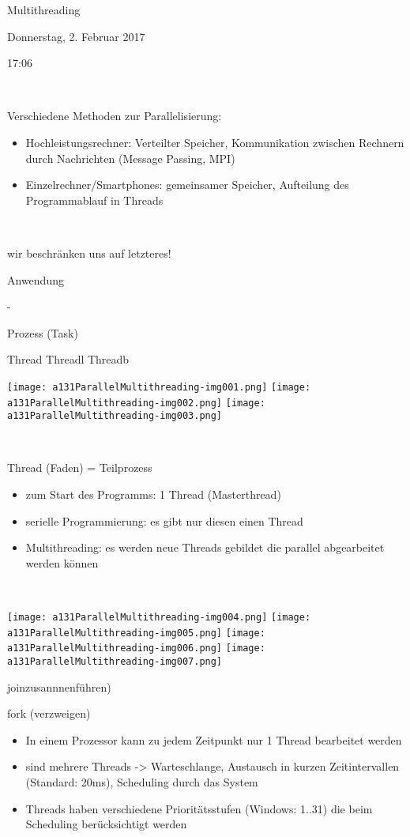 Multithreading

Donnerstag, 2. Februar 2017

17:06

~

Verschiedene Methoden zur Parallelisierung: 

\begin{itemize}
\item Hochleistungsrechner: Verteilter Speicher, Kommunikation zwischen Rechnern durch Nachrichten (Message Passing, MPI)
\item Einzelrechner/Smartphones: gemeinsamer Speicher, Aufteilung des Programmablauf in Threads
\end{itemize}
~

wir beschränken uns auf letzteres!

Anwendung

{}-

Prozess (Task)

Thread Threadl Threadb

 \texttt{[image: a131ParallelMultithreading-img001.png]}  \texttt{[image: a131ParallelMultithreading-img002.png]}  \texttt{[image: a131ParallelMultithreading-img003.png]} 

~

Thread (Faden) = Teilprozess

\begin{itemize}
\item zum Start des Programms: 1 Thread (Masterthread)
\item serielle Programmierung: es gibt nur diesen einen Thread
\item Multithreading: es werden neue Threads gebildet die parallel abgearbeitet werden können
\end{itemize}
~

 \texttt{[image: a131ParallelMultithreading-img004.png]}  \texttt{[image: a131ParallelMultithreading-img005.png]}  \texttt{[image: a131ParallelMultithreading-img006.png]}  \texttt{[image: a131ParallelMultithreading-img007.png]} 

joinzusannnenführen)

fork (verzweigen)

\begin{itemize}
\item In einem Prozessor kann zu jedem Zeitpunkt nur 1 Thread bearbeitet werden
\item sind mehrere Threads -{\textgreater} Warteschlange, Austausch in kurzen Zeitintervallen (Standard: 20ms), Scheduling durch das System
\item Threads haben verschiedene Prioritätsstufen (Windows: 1..31) die beim Scheduling berücksichtigt werden
\end{itemize}
~

